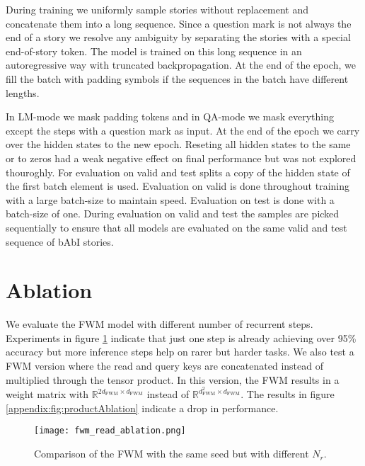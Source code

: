 \documentclass{article} \usepackage{iclr2021_conference,times}
\begin{document}
During training we uniformly sample stories without replacement and concatenate them into a long sequence. 
Since a question mark is not always the end of a story we resolve any ambiguity by separating the stories with a special end-of-story token. 
The model is trained on this long sequence in an autoregressive way with truncated backpropagation. 
At the end of the epoch, we fill the batch with padding symbols if the sequences in the batch have different lengths. 

In LM-mode we mask padding tokens and in QA-mode we mask everything except the steps with a question mark as input. 
At the end of the epoch we carry over the hidden states to the new epoch. 
Reseting all hidden states to the same or to zeros had a weak negative effect on final performance but was not explored thouroghly. 
For evaluation on valid and test splits a copy of the hidden state of the first batch element is used.
Evaluation on valid is done throughout training with a large batch-size to maintain speed. 
Evaluation on test is done with a batch-size of one. 
During evaluation on valid and test the samples are picked sequentially to ensure that all models are evaluated on the same valid and test sequence of bAbI stories.

\section{Ablation}
\label{appendix:sec:ablation}
We evaluate the FWM model with different number of recurrent steps. Experiments in figure \ref{appendix:fig:readAblation} indicate that just one step is already achieving over 95\% accuracy but more inference steps help on rarer but harder tasks. We also test a FWM version where the read and query keys are concatenated instead of multiplied through the tensor product. In this version, the FWM results in a weight matrix with $\mathbb{R}^{2d_\text{FWM} \times d_\text{FWM}}$ instead of $\mathbb{R}^{d_\text{FWM}^2 \times d_\text{FWM}}$. The results in figure \ref{appendix:fig:productAblation} indicate a drop in performance.

\begin{figure}[H]
  \centering
\texttt{[image: fwm\_read\_ablation.png]}
  \caption{Comparison of the FWM with the same seed but with different $N_r$. }
  \label{appendix:fig:readAblation}
\end{figure}
\end{document}
